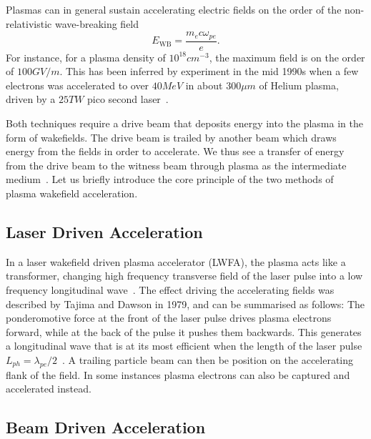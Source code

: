 Plasmas can in general sustain accelerating electric fields on the order of the non-relativistic wave-breaking field~\cite{dawson:1959, esarey:1996}
\begin{equation}
    E_{\mathrm{WB}} = \frac{m_{e} c \omega_{pe}}{e}. \label{EQ:EWB}
\end{equation}
For instance, for a plasma density of $10^{18}\unit{cm}^{-3}$, the maximum field is on the order of $100\unit{GV/m}$. This has been inferred by experiment in the mid 1990s when a few electrons was accelerated to over $40\unit{MeV}$ in about $300\unit{\mu m}$ of Helium plasma, driven by a $25\unit{TW}$ pico second laser~\cite{modena:1995}.

Both techniques require a drive beam that deposits energy into the plasma in the form of wakefields. The drive beam is trailed by another beam which draws energy from the fields in order to accelerate. We thus see a transfer of energy from the drive beam to the witness beam through plasma as the intermediate medium~\cite{muggli:2009}. Let us briefly introduce the core principle of the two methods of plasma wakefield acceleration. 

\subsection{Laser Driven Acceleration}
\label{Int:LWFA}

In a laser wakefield driven plasma accelerator (LWFA), the plasma acts like a transformer, changing high frequency transverse field of the laser pulse into a low frequency longitudinal wave~\cite{malka:2009}. The effect driving the accelerating fields was described by Tajima and Dawson in 1979, and can be summarised as follows: The ponderomotive force at the front of the laser pulse drives plasma electrons forward, while at the back of the pulse it pushes them backwards. This generates a longitudinal wave that is at its most efficient when the length of the laser pulse $L_{ph} = \lambda_{pe}/2$~\cite{tajima:1979}. A trailing particle beam can then be position on the accelerating flank of the field. In some instances plasma electrons can also be captured and accelerated instead.

\subsection{Beam Driven Acceleration}
\label{Int:BDPWFA}

